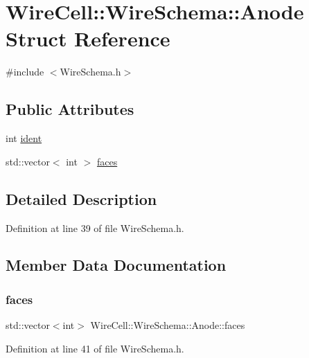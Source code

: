 \hypertarget{struct_wire_cell_1_1_wire_schema_1_1_anode}{}\section{Wire\+Cell\+:\+:Wire\+Schema\+:\+:Anode Struct Reference}
\label{struct_wire_cell_1_1_wire_schema_1_1_anode}


{\ttfamily \#include $<$Wire\+Schema.\+h$>$}

\subsection*{Public Attributes}
\begin{DoxyCompactItemize}
\item 
int \hyperlink{struct_wire_cell_1_1_wire_schema_1_1_anode_abab2b1721d2d4858454210a290ce42eb}{ident}
\item 
std\+::vector$<$ int $>$ \hyperlink{struct_wire_cell_1_1_wire_schema_1_1_anode_afdb9e95ace6ad64dc97fab883781b9b4}{faces}
\end{DoxyCompactItemize}


\subsection{Detailed Description}


Definition at line 39 of file Wire\+Schema.\+h.



\subsection{Member Data Documentation}
\mbox{\label{struct_wire_cell_1_1_wire_schema_1_1_anode_afdb9e95ace6ad64dc97fab883781b9b4}} 
\subsubsection{\texorpdfstring{faces}{faces}}
{\footnotesize\ttfamily std\+::vector$<$int$>$ Wire\+Cell\+::\+Wire\+Schema\+::\+Anode\+::faces}



Definition at line 41 of file Wire\+Schema.\+h.

